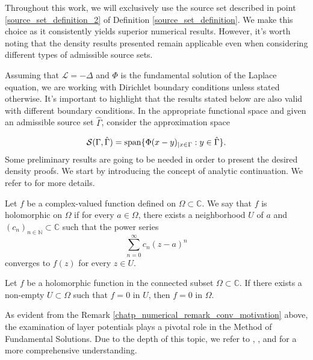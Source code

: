 Throughout this work, we will exclusively use the source set described in point \ref{source_set_definition_2} of Definition \ref{source_set_definition}. We make this choice as it consistently yields superior numerical results. However, it's worth noting that the density results presented remain applicable even when considering different types of admissible source sets.

Assuming that $\mathcal{L} = -\Delta$ and $\Phi$ is the fundamental solution of the Laplace equation, we are working with Dirichlet boundary conditions unless stated otherwise. It's important to highlight that the results stated below are also valid with different boundary conditions. In the appropriate functional space and given an admissible source set $\hat{\Gamma}$, consider the approximation space

\[
    \mathcal{S}(\Gamma, \hat{\Gamma}) = \operatorname{span}\{\Phi(x-y)_{|x \in \Gamma} : y \in \hat{\Gamma}\}.
\]
Some preliminary results are going to be needed in order to present the desired density proofs.
We start by introducing the concept of analytic continuation. We refer to \cite{narasimhan2012complex} for more details.
\begin{definition}
    Let \(f\) be a complex-valued function defined on \(\Omega \subset \mathbb{C}\). We say that \(f\) is holomorphic on \(\Omega\) if for every \(a \in \Omega\), there exists a neighborhood \(U\) of \(a\) and \((c_n)_{n \in \mathbb{N}} \subset \mathbb{C}\) such that the power series
    \[
        \sum_{n=0}^{\infty} c_n(z-a)^n
    \]
    converges to \(f(z)\) for every \(z \in U\).
\end{definition}
\begin{theorem}\label{ana_cont}
    Let \(f\) be a holomorphic function in the connected subset \(\Omega \subset \mathbb{C}\). If there exists a non-empty \(U \subset \Omega\) such that \(f = 0\) in \(U\), then \(f = 0\) in \(\Omega\).
\end{theorem}
As evident from the Remark \ref{chatp_numerical_remark_conv_motivation} above, the examination of layer potentials plays a pivotal role in the Method of Fundamental Solutions. Due to the depth of this topic, we refer to \cite{chen2010boundary}, \cite{kress2013linear}, and \cite{colton2013integral} for a more comprehensive understanding.

